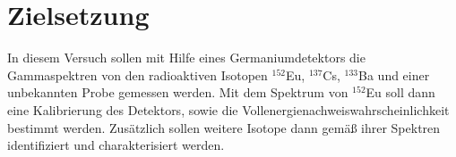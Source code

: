 \section{Zielsetzung}
In diesem Versuch sollen mit Hilfe eines Germaniumdetektors die Gammaspektren von den radioaktiven Isotopen $^{152}$Eu, $^{137}$Cs, $^{133}$Ba und einer unbekannten Probe gemessen werden.
Mit dem Spektrum von $^{152}$Eu soll dann eine Kalibrierung des Detektors, sowie die Vollenergienachweiswahrscheinlichkeit bestimmt werden.
Zusätzlich sollen weitere Isotope dann gemäß ihrer Spektren identifiziert und charakterisiert werden.